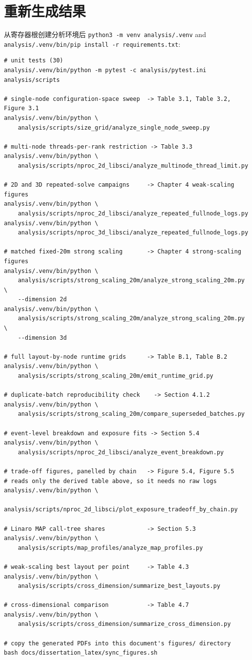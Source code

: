 \documentclass[11pt,a4paper,oneside]{report}
\begin{document}
\section{重新生成结果}
\label{app:regen}
从寄存器根创建分析环境后
\texttt{python3 -m venv analysis/.venv} and
\texttt{analysis/.venv/bin/pip install -r requirements.txt}:

\begin{verbatim}
# unit tests (30)
analysis/.venv/bin/python -m pytest -c analysis/pytest.ini analysis/scripts

# single-node configuration-space sweep  -> Table 3.1, Table 3.2, Figure 3.1
analysis/.venv/bin/python \
    analysis/scripts/size_grid/analyze_single_node_sweep.py

# multi-node threads-per-rank restriction -> Table 3.3
analysis/.venv/bin/python \
    analysis/scripts/nproc_2d_libsci/analyze_multinode_thread_limit.py

# 2D and 3D repeated-solve campaigns     -> Chapter 4 weak-scaling figures
analysis/.venv/bin/python \
    analysis/scripts/nproc_2d_libsci/analyze_repeated_fullnode_logs.py
analysis/.venv/bin/python \
    analysis/scripts/nproc_3d_libsci/analyze_repeated_fullnode_logs.py

# matched fixed-20m strong scaling       -> Chapter 4 strong-scaling figures
analysis/.venv/bin/python \
    analysis/scripts/strong_scaling_20m/analyze_strong_scaling_20m.py \
    --dimension 2d
analysis/.venv/bin/python \
    analysis/scripts/strong_scaling_20m/analyze_strong_scaling_20m.py \
    --dimension 3d

# full layout-by-node runtime grids      -> Table B.1, Table B.2
analysis/.venv/bin/python \
    analysis/scripts/strong_scaling_20m/emit_runtime_grid.py

# duplicate-batch reproducibility check    -> Section 4.1.2
analysis/.venv/bin/python \
    analysis/scripts/strong_scaling_20m/compare_superseded_batches.py

# event-level breakdown and exposure fits -> Section 5.4
analysis/.venv/bin/python \
    analysis/scripts/nproc_2d_libsci/analyze_event_breakdown.py

# trade-off figures, panelled by chain   -> Figure 5.4, Figure 5.5
# reads only the derived table above, so it needs no raw logs
analysis/.venv/bin/python \
    analysis/scripts/nproc_2d_libsci/plot_exposure_tradeoff_by_chain.py

# Linaro MAP call-tree shares            -> Section 5.3
analysis/.venv/bin/python \
    analysis/scripts/map_profiles/analyze_map_profiles.py

# weak-scaling best layout per point     -> Table 4.3
analysis/.venv/bin/python \
    analysis/scripts/cross_dimension/summarize_best_layouts.py

# cross-dimensional comparison           -> Table 4.7
analysis/.venv/bin/python \
    analysis/scripts/cross_dimension/summarize_cross_dimension.py

# copy the generated PDFs into this document's figures/ directory
bash docs/dissertation_latex/sync_figures.sh
\end{verbatim}
\end{document}
